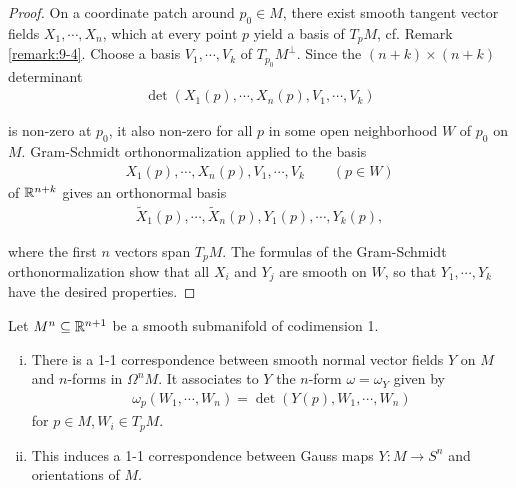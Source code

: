 \begin{proof}
  On a coordinate patch around $p_0\in M$, there exist smooth tangent vector
fields $X_1, \cdots, X_n$, which at every point $p$ yield a basis of $T_pM$, cf. 
Remark \ref{remark:9-4}. Choose a basis $V_1, \cdots, V_k$ of $T_{p_0}M^\perp$. Since 
the $(n+k)\times (n+k)$ determinant 
\begin{align*}
  \det(X_1(p), \cdots, X_n(p), V_1, \cdots, V_k) 
\end{align*}

is non-zero at $p_0$, it also non-zero for all $p$ in some open neighborhood $W$ of $p_0$
on $M$. Gram-Schmidt orthonormalization applied to the basis
\begin{align*}
  X_1(p), \cdots, X_n(p), V_1, \cdots, V_k\qquad (p\in W)
\end{align*}
of $\mathbb{R}^{n+k}$ gives an orthonormal basis 
\begin{align*}
  \tilde{X}_1(p), \cdots,\tilde{X}_n(p), Y_1(p), \cdots, Y_k(p),
\end{align*}

where the first $n$ vectors span $T_pM$. The formulas of the Gram-Schmidt orthonormalization 
show that all $X_i$ and $Y_j$ are smooth on $W$, so that $Y_1, \cdots, Y_k$ have the desired 
properties.
\end{proof}

\begin{proposition}\label{prop:9-22}
  Let $M^n\subseteq \mathbb{R}^{n+1}$ be a smooth submanifold of codimension 1.
  \begin{enumerate}[(i)]
    \item There is a 1-1 correspondence between smooth normal vector fields $Y$ on
      $M$ and $n$-forms in $\Omega^n{M}$. It associates to $Y$ the $n$-form $\omega=\omega_Y$ 
      given by
      \begin{align*}
        \omega_p(W_1, \cdots, W_n) = \det (Y(p), W_1, \cdots, W_n)
      \end{align*}
      for $p\in M, W_i\in T_pM$.
    \item This induces a 1-1 correspondence between Gauss maps $Y:M\to S^n$ and
      orientations of $M$.
  \end{enumerate}
\end{proposition}

